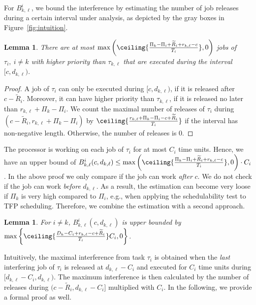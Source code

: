 \documentclass[conference]{IEEEtran}
\newtheorem{lem}[thm]{Lemma}
\theoremstyle{definition}
\theoremstyle{remark}
\newcommand{\Rtilde}{\widetilde{R}}
\begin{document}
	For $B^i_{k,\ell}$, we bound the interference by estimating the number of job releases during a certain interval under analysis, as depicted by the gray boxes in Figure~\ref{fig:intuition}.

	\begin{lem}\label{lem:ineqk_1}
		There are at most $\max\left(\ceiling{\frac{\Pi_k-\Pi_i+\Rtilde_i+r_{k,\ell}-c}{T_i}}, 0\right)$ jobs of $\tau_i,~i\neq k$ with higher priority than $\tau_{k,\ell}$ that are executed during the interval $[c, d_{k,\ell})$.
	\end{lem}

	\begin{proof}
		A job of $\tau_i$ can only be executed during $[c,d_{k,\ell})$, if it is released after $c-\Rtilde_i$.
		Moreover, it can have higher priority than $\tau_{k,\ell}$, if it is released no later than $r_{k,\ell} + \Pi_k - \Pi_i$.
		We count the maximal number of releases of $\tau_i$ during $(c-\Rtilde_i, r_{k,\ell} + \Pi_k - \Pi_i)$ by $\ceiling{\frac{r_{k,\ell} + \Pi_k - \Pi_i - c + \Rtilde_i}{T_i}}$ if the interval has non-negative length.
		Otherwise, the number of releases is $0$.
	\end{proof}
	
	The processor is working on each job of $\tau_i$ for at most $C_i$ time units.
	Hence, we have an upper bound of $B_{k,\ell}^i(c,d_{k,\ell}) \leq \max\left(\ceiling{\frac{\Pi_k-\Pi_i+\Rtilde_i+r_{k,\ell}-c}{T_i}}, 0\right) \cdot C_i$.
	In the above proof we only compare if the job can work \emph{after} $c$.
	We do not check if the job can work \emph{before} $d_{k,\ell}$.
	As a result, the estimation can become very loose if $\Pi_k$ is very high compared to $\Pi_i$, e.g., when applying the schedulability test to TFP scheduling.
	Therefore, we combine the estimation with a second approach.
	
	\begin{lem}\label{lem:ineqk_2}
		For $i\neq k$,  $B_{k,\ell}^i(c,d_{k,\ell})$ is upper bounded
        by
        $\max\left\{\ceiling{\frac{D_k-C_i+r_{k,\ell}-c+\Rtilde_i}{T_i}}C_i, 0\right\}$.
	\end{lem}
	
	Intuitively, the maximal interference from task $\tau_i$ is obtained when the \emph{last} interfering job of $\tau_i$ is released at $d_{k,\ell}-C_i$ and executed for $C_i$ time units during $[d_{k,\ell}-C_i, d_{k,\ell})$.
	The maximum interference is then calculated by the number of releases during $(c-\Rtilde_i, d_{k,\ell}-C_i]$ multiplied with $C_i$.
	In the following, we provide a formal proof as well.
\end{document}
